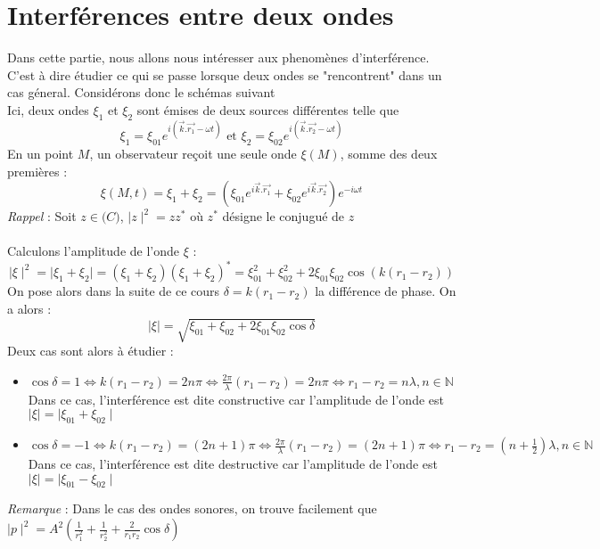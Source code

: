 \section{Interférences entre deux ondes}
Dans cette partie, nous allons nous intéresser aux phenomènes d'interférence. C'est à dire étudier ce qui se passe lorsque deux ondes se "rencontrent" dans un cas géneral. Considérons donc le schémas suivant \\
Ici, deux ondes $\xi_1$ et $\xi_2$ sont émises de deux sources différentes telle que
\[
\xi_1=\xi_{01}e^{i(\vec{k}.\vec{r_1}-\omega t)} \textrm{ et }
\xi_2=\xi_{02}e^{i(\vec{k}.\vec{r_2}-\omega t)}
\]
En un point $M$, un observateur reçoit une seule onde $\xi(M)$, somme des deux premières :
\[ \xi(M,t)=\xi_1+\xi_2=(\xi_{01}e^{i\vec{k}.\vec{r_1}}+\xi_{02}e^{i\vec{k}.\vec{r_2}})e^{-i\omega t} \]
\emph{Rappel} : Soit $z\in\mathbb(C)$, $\mid z\mid^2=zz^*$ où $z^*$ désigne le conjugué de $z$\\\\
Calculons l'amplitude de l'onde $\xi$ : 
\[ \mid\xi\mid^2=\mid\xi_1+\xi_2\mid=(\xi_1+\xi_2)(\xi_1+\xi_2)^*=\xi_{01}^2+\xi_{02}^2+2\xi_{01}\xi_{02}\cos(k(r_1-r_2)) \]
On pose alors dans la suite de ce cours $\delta=k(r_1-r_2)$ la différence de phase. On a alors :
\[ \mid\xi\mid=\sqrt{\xi_{01}+\xi_{02}+2\xi_{01}\xi_{02}\cos\delta} \]
Deux cas sont alors à étudier :
\begin{itemize}
\item $\cos\delta=1\Leftrightarrow k(r_1-r_2)=2n\pi \Leftrightarrow \frac{2 \pi}{\lambda}(r_1-r_2)=2n\pi\Leftrightarrow r_1-r_2=n\lambda, n\in\mathbb{N}$ Dans ce cas, l'interférence est dite constructive car l'amplitude de l'onde est $\mid\xi\mid=\mid\xi_{01}+\xi_{02}\mid$
\item $\cos\delta=-1\Leftrightarrow k(r_1-r_2)=(2n+1)\pi\Leftrightarrow\frac{2\pi}{\lambda}(r_1-r_2)=(2n+1)\pi\Leftrightarrow r_1-r_2=(n+\frac{1}{2})\lambda, n\in\mathbb{N}$ Dans ce cas, l'interférence est dite destructive car l'amplitude de l'onde est $\mid\xi\mid=\mid\xi_{01}-\xi_{02}\mid$
\end{itemize}
\emph{Remarque} : Dans le cas des ondes sonores, on trouve facilement que $\mid p\mid^2=A^2\left(\frac{1}{r_1^2}+\frac{1}{r_2^2}+\frac{2}{r_1r_2}\cos\delta\right)$

